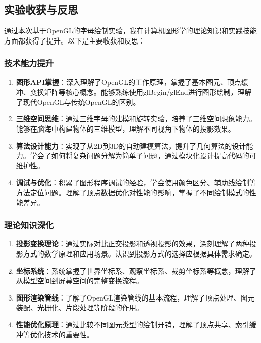 \documentclass[a4paper]{article}
\begin{document}
\subsection{实验收获与反思}

通过本次基于OpenGL的字母绘制实验，我在计算机图形学的理论知识和实践技能方面都获得了提升。以下是主要收获和反思：

\subsubsection{技术能力提升}

\begin{enumerate}
    \item \textbf{图形API掌握}：深入理解了OpenGL的工作原理，掌握了基本图元、顶点缓冲、变换矩阵等核心概念。能够熟练使用glBegin/glEnd进行图形绘制，理解了现代OpenGL与传统OpenGL的区别。

    \item \textbf{三维空间思维}：通过三维字母的建模和旋转实验，培养了三维空间想象能力。能够在脑海中构建物体的三维模型，理解不同视角下物体的投影效果。

    \item \textbf{算法设计能力}：实现了从2D到3D的自动建模算法，提升了几何算法的设计能力。学会了如何将复杂问题分解为简单子问题，通过模块化设计提高代码的可维护性。

    \item \textbf{调试与优化}：积累了图形程序调试的经验，学会使用颜色区分、辅助线绘制等方法定位问题。理解了顶点数据优化对性能的影响，掌握了不同绘制模式的性能差异。
\end{enumerate}

\subsubsection{理论知识深化}

\begin{enumerate}
    \item \textbf{投影变换理论}：通过实际对比正交投影和透视投影的效果，深刻理解了两种投影方式的数学原理和应用场景。认识到投影方式的选择应根据具体需求确定。

    \item \textbf{坐标系统}：系统掌握了世界坐标系、观察坐标系、裁剪坐标系等概念，理解了从模型空间到屏幕空间的完整变换流程。

    \item \textbf{图形渲染管线}：了解了OpenGL渲染管线的基本流程，理解了顶点处理、图元装配、光栅化、片段处理等阶段的作用。

    \item \textbf{性能优化原理}：通过比较不同图元类型的绘制开销，理解了顶点共享、索引缓冲等优化技术的重要性。
\end{enumerate}
\end{document}
